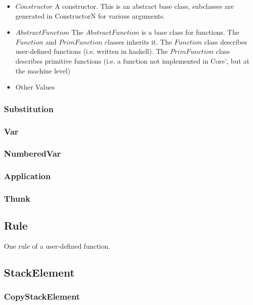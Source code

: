 \begin{itemize}
\item{$Constructor$} A constructor. This is an abstract base class, subclasses are 
generated in ConstructorN for various arguments.
\item{$AbstractFunction$} The $AbstractFunction$ is a base class for functions. The 
$Function$ and $PrimFunction$ classes inherits it. The $Function$ class describes
user-defined functions (i.e. written in haskell). The $PrimFunction$ class describes
primitive functions (i.e. a function not implemented in Core', but at the machine level)
\item{Other Values}
\end{itemize}

\subsubsection*{Substitution}

\subsubsection*{Var}

\subsubsection*{NumberedVar}

\subsubsection*{Application}

\subsubsection*{Thunk}

\subsection*{Rule}

One rule of a user-defined function.

\subsection*{StackElement}

\subsubsection*{CopyStackElement}

